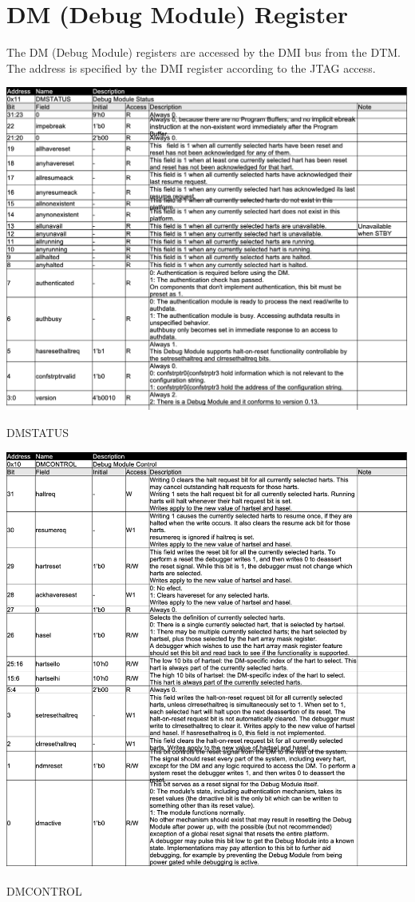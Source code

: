 \section{DM (Debug Module) Register}

The DM (Debug Module) registers are accessed by the DMI bus from the DTM. The address is specified by the DMI register according to the JTAG access.\\

\begin{table}[H]
    \includegraphics[width=1.00\columnwidth]{./Table/DMSTATUS.png}
    \caption{DMSTATUS}
    \label{tb:DMSTATUS}
\end{table}

\begin{table}[H]
    \includegraphics[width=1.00\columnwidth]{./Table/DMCONTROL.png}
    \caption{DMCONTROL}
    \label{tb:DMCONTROL}
\end{table}

